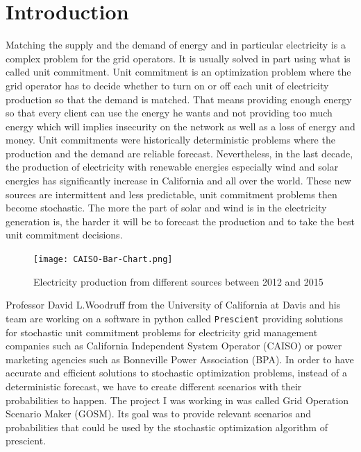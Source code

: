 \documentclass{article}
\begin{document}
   \tableofcontents

   \newpage
   \section*{Introduction}
	
   
	Matching the supply and the demand of energy and in particular electricity is a complex problem for the grid operators. It is usually solved in part using what is called unit commitment. Unit commitment is an optimization problem where the grid operator has to decide whether to turn on or off each unit of electricity production so that the demand is matched. That means providing enough energy so that every client can use the energy he wants and not providing too much energy which will implies insecurity on the network as well as a loss of energy and money. Unit commitments were historically deterministic problems where the production and the demand are reliable forecast. Nevertheless, in the last decade, the production of electricity with renewable energies especially wind and solar energies has significantly increase in California and all over the world. These new sources are intermittent and less predictable, unit commitment problems then become stochastic. The more the part of solar and wind is in the electricity generation is, the harder it will be to forecast the production and to take the best unit commitment decisions.\newline
	
	\begin{figure}[h]
	\centering  
    \texttt{[image: CAISO-Bar-Chart.png]}
    \caption{Electricity production from different sources between 2012 and 2015}
\end{figure}
	
	Professor David L.Woodruff from the University of California at Davis and his team are working on a software in python called \texttt{Prescient} providing solutions for stochastic unit commitment problems for electricity grid management companies such as California Independent System Operator (CAISO) or power marketing agencies such as Bonneville Power Association (BPA). In order to have accurate and efficient solutions to stochastic optimization problems, instead of a deterministic forecast, we have to  create different scenarios with their probabilities to happen. The project I was working in was called Grid Operation Scenario Maker (GOSM). Its goal was to provide relevant scenarios and probabilities that could be used by the stochastic optimization algorithm of prescient.
	
\end{document}
